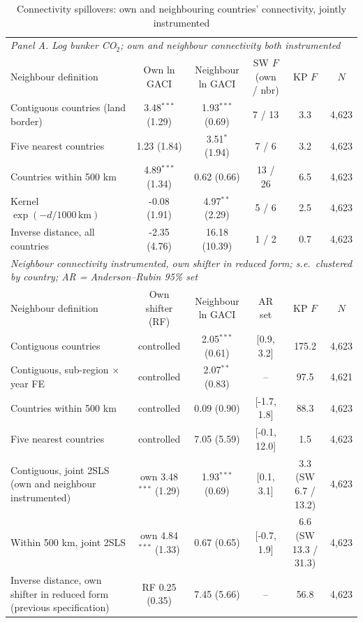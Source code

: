 \documentclass[12pt]{article}
\begin{document}
\begin{table}[htbp]
\centering
\begin{threeparttable}
\caption{Connectivity spillovers: own and neighbouring countries' connectivity, jointly instrumented}
\label{tab:spillover}
\footnotesize
\begin{tabular}{lccccc}
\toprule
\multicolumn{6}{l}{\textit{Panel A. Log bunker CO$_2$; own and neighbour connectivity both instrumented}} \\
Neighbour definition & Own ln GACI & Neighbour ln GACI & SW $F$ (own / nbr) & KP $F$ & $N$ \\
\midrule
  Contiguous countries (land border) & 3.48$^{***}$ (1.29) & 1.93$^{***}$ (0.69) & 7 / 13 & 3.3 & 4,623 \\
  Five nearest countries & 1.23 (1.84) & 3.51$^{*}$ (1.94) & 7 / 6 & 3.2 & 4,623 \\
  Countries within 500 km & 4.89$^{***}$ (1.34) & 0.62 (0.66) & 13 / 26 & 6.5 & 4,623 \\
  Kernel $\exp(-d/1000\,\mathrm{km})$ & -0.08 (1.91) & 4.97$^{**}$ (2.29) & 5 / 6 & 2.5 & 4,623 \\
  Inverse distance, all countries & -2.35 (4.76) & 16.18 (10.39) & 1 / 2 & 0.7 & 4,623 \\
\midrule
\multicolumn{6}{l}{\textit{Neighbour connectivity instrumented, own shifter in reduced form; s.e.\ clustered by country; AR = Anderson--Rubin 95\% set}} \\
Neighbour definition & Own shifter (RF) & Neighbour ln GACI & AR set & KP $F$ & $N$ \\
  Contiguous countries & controlled & 2.05$^{***}$ (0.61) & [0.9, 3.2] & 175.2 & 4,623 \\
  Contiguous, sub-region $\times$ year FE & controlled & 2.07$^{**}$ (0.83) & -- & 97.5 & 4,621 \\
  Countries within 500 km & controlled & 0.09 (0.90) & [-1.7, 1.8] & 88.3 & 4,623 \\
  Five nearest countries & controlled & 7.05 (5.59) & [-0.1, 12.0] & 1.5 & 4,623 \\
  Contiguous, joint 2SLS (own and neighbour instrumented) & own 3.48$^{***}$ (1.29) & 1.93$^{***}$ (0.69) & [0.1, 3.1] & 3.3 (SW 6.7 / 13.2) & 4,623 \\
  Within 500 km, joint 2SLS & own 4.84$^{***}$ (1.33) & 0.67 (0.65) & [-0.7, 1.9] & 6.6 (SW 13.3 / 31.3) & 4,623 \\
  Inverse distance, own shifter in reduced form (previous specification) & RF 0.25 (0.35) & 7.45 (5.66) & -- & 56.8 & 4,623 \\

\end{tabular}
\end{threeparttable}
\end{table}
\end{document}
